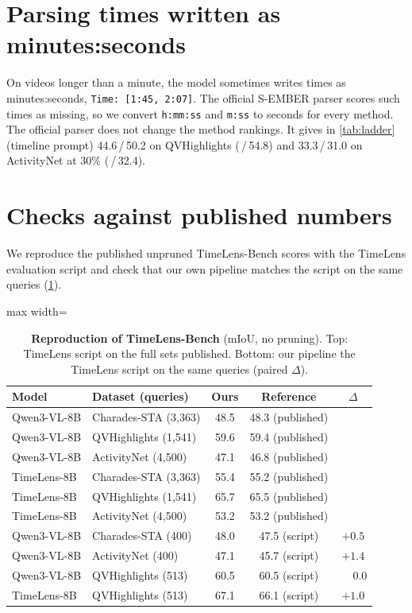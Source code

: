 \section{Parsing times written as minutes:seconds}
\label{sec:suppl-parse}

On videos longer than a minute, the model sometimes writes times as minutes:seconds, \eg
\texttt{Time: [1:45, 2:07]}. The official S-EMBER parser scores such times as missing, so we convert \texttt{h:mm:ss}
and \texttt{m:ss} to seconds for every method. The official parser does not change the method rankings. It gives
\method in \cref{tab:ladder} (timeline prompt) 44.6\,/\,50.2 on QVHighlights (\,/\,54.8) and 33.3\,/\,31.0
on ActivityNet at 30\% (\,/\,32.4). 

\section{Checks against published numbers}
\label{sec:suppl-anchors}

We reproduce the published unpruned TimeLens-Bench scores with the TimeLens evaluation script and check that our
own pipeline matches the script on the same queries (\cref{tab:anchors}).

\begin{table}[h]
  \centering
  \small
  \setlength{\tabcolsep}{3pt}
  \caption{\textbf{Reproduction of TimeLens-Bench} (mIoU, no pruning). Top: TimeLens script on the full sets
  \vs published. Bottom: our pipeline \vs the TimeLens script on the same queries (paired $\Delta$).}
  \label{tab:anchors}
  \begin{adjustbox}{max width=\linewidth}\begin{tabular}{@{}llccc@{}}
    \toprule
    Model & Dataset (queries) & Ours & Reference & $\Delta$ \\
    \midrule
    Qwen3-VL-8B & Charades-STA (3{,}363) & 48.5 & 48.3 (published) & \\
    Qwen3-VL-8B & QVHighlights (1{,}541) & 59.6 & 59.4 (published) & \\
    Qwen3-VL-8B & ActivityNet (4{,}500)  & 47.1 & 46.8 (published) & \\
    TimeLens-8B & Charades-STA (3{,}363) & 55.4 & 55.2 (published) & \\
    TimeLens-8B & QVHighlights (1{,}541) & 65.7 & 65.5 (published) & \\
    TimeLens-8B & ActivityNet (4{,}500)  & 53.2 & 53.2 (published) & \\
    \midrule
    Qwen3-VL-8B & Charades-STA (400)     & 48.0 & 47.5 (script) & $+0.5$ \\
    Qwen3-VL-8B & ActivityNet (400)      & 47.1 & 45.7 (script) & $+1.4$ \\
    Qwen3-VL-8B & QVHighlights (513)     & 60.5 & 60.5 (script) & $\phantom{+}0.0$ \\
    TimeLens-8B & QVHighlights (513)     & 67.1 & 66.1 (script) & $+1.0$ \\
    \bottomrule
  \end{tabular}\end{adjustbox}
\end{table}

